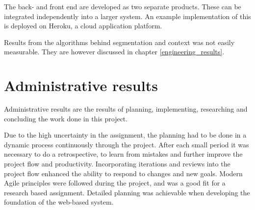 The back- and front end are developed as two separate products. These can be integrated independently into a larger system. An example implementation of this is deployed on Heroku, a cloud application platform.

Results from the algorithms behind segmentation and context was not easily measurable. They are however discussed in chapter \ref{engineering_results}.

\section{Administrative results}
Administrative results are the results of planning, implementing, researching and concluding the work done in this project. 

Due to the high uncertainty in the assignment, the planning had to be done in a dynamic process continuously through the project. After each small period it was necessary to do a retrospective, to learn from mistakes and further improve the project flow and productivity. Incorporating iterations and reviews into the project flow enhanced the ability to respond to changes and new goals. Modern Agile principles were followed during the project, and was a good fit for a research based assignment. Detailed planning was achievable when developing the foundation of the web-based system. 
